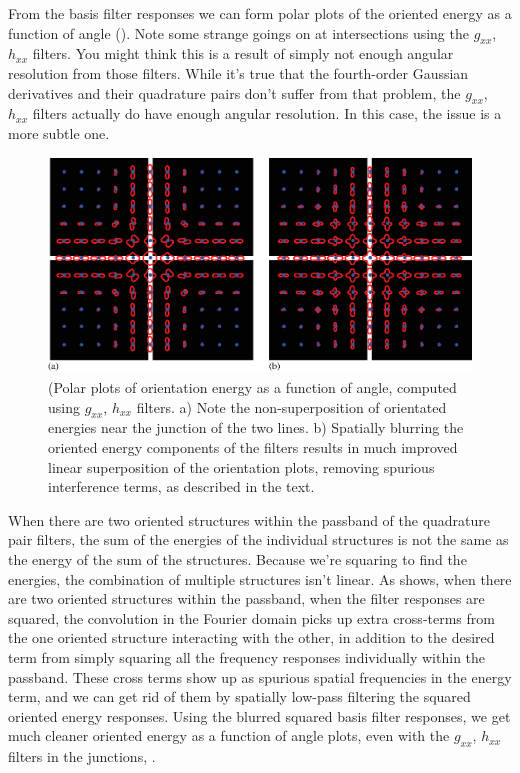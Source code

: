 From the basis filter responses we can form polar plots of
the oriented energy as a function of angle (\fig{\ref{fig:multioriflorets}}).
Note some strange goings on at intersections using the $g_{xx}$, $h_{xx}$
filters.  You might think this is a result of simply not enough
angular resolution from those filters. While it's true that the fourth-order Gaussian derivatives and their quadrature
pairs don't suffer from that problem, the $g_{xx}$, $h_{xx}$ filters
actually do have enough angular resolution. In this case, the issue is a more subtle
one.


\begin{figure}[t]
	\centerline{
		\includegraphics[width=1\linewidth]{figures/spatial_filter_sets/steer_quad_polarplot_cross.eps}
	}
	\caption{(Polar plots of orientation energy as a
		function of angle, computed using $g_{xx}$, $h_{xx}$ filters.  a) Note the
		non-superposition of orientated energies near the junction of the
		two lines.  b) Spatially blurring the oriented energy components of
		the filters results in much improved linear superposition of
		the orientation plots, removing spurious interference terms, as
		described in the text.}
	\label{fig:multioriflorets}
\end{figure}


When there are two oriented structures within the passband
of the quadrature pair filters, the sum of the energies of the
individual structures is not the same as the energy of the sum of the
structures.  Because we're squaring to find the energies, the
combination of multiple structures isn't linear.   As 
shows, when there are two oriented structures within the passband,
when the filter responses are squared, the convolution in the Fourier
domain picks up extra cross-terms from the one oriented structure
interacting with the other, in addition to the desired term from
simply squaring all the frequency responses individually within the
passband.  These cross terms show up as spurious spatial frequencies
in the energy term, and we can get rid of them by spatially low-pass
filtering the squared oriented energy responses.  Using the blurred
squared basis filter responses, we get much cleaner oriented energy as
a function of angle plots, even with the $g_{xx}$, $h_{xx}$ filters in
the junctions, .

